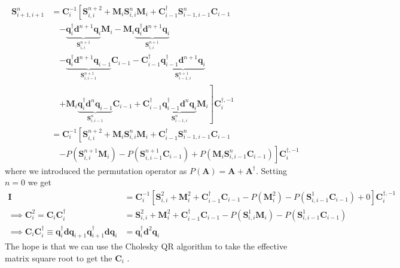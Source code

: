 \begin{align}
    \bm{S}_{i+1,i+1}^{n} &= \bm{C}_i^{-1}\left[\bm{S}_{i,i}^{n+2} + \bm{M}_i\bm{S}_{i,i}^{n}\bm{M}_i + \bm{C}_{i-1}^{\dag}\bm{S}_{i-1,i-1}^{n}\bm{C}_{i-1} \right. \nonumber \\
    &\quad \left. - \underbrace{\bm{q}_i^{\dag}\bm{d}^{n+1}\bm{q}_i}_{\bm{S}_{i,i}^{n+1}}\bm{M}_i - \bm{M}_i\underbrace{\bm{q}_i^{\dag}\bm{d}^{n+1}\bm{q}_i}_{\bm{S}_{i,i}^{n+1}} \right. \nonumber \\
    &\quad \left. - \underbrace{\bm{q}_{i}^{\dag}\bm{d}^{n+1}\bm{q}_{i-1}}_{\bm{S}_{i,i-1}^{n+1}}\bm{C}_{i-1} - \bm{C}_{i-1}^{\dag}\underbrace{\bm{q}_{i-1}^{\dag}\bm{d}^{n+1}\bm{q}_i}_{\bm{S}_{i-1,i}^{n+1}} \right. \nonumber \\
    &\quad \left. + \bm{M}_i\underbrace{\bm{q}_i^{\dag}\bm{d}^{n}\bm{q}_{i-1}}_{\bm{S}_{i,i-1}^n}\bm{C}_{i-1} + \bm{C}_{i-1}^{\dag}\underbrace{\bm{q}_{i-1}^{\dag}\bm{d}^{n}\bm{q}_i}_{\bm{S}_{i-1,i}^n}\bm{M}_i \right] \bm{C}_i^{\dag, -1} \\
    &= \bm{C}_i^{-1}\left[\bm{S}_{i,i}^{n+2} + \bm{M}_i\bm{S}_{i,i}^{n}\bm{M}_i + \bm{C}_{i-1}^{\dag}\bm{S}_{i-1,i-1}^{n}\bm{C}_{i-1} \right. \nonumber \\
    &\quad \left. - P(\bm{S}_{i,i}^{n+1}\bm{M}_i) - P(\bm{S}_{i,i-1}^{n+1}\bm{C}_{i-1}) + P(\bm{M}_i\bm{S}_{i,i-1}^{n}\bm{C}_{i-1}) \right] \bm{C}_i^{\dag, -1}
\end{align}
where we introduced the permutation operator as $P(\bm{A}) = \bm{A}+\bm{A}^{\dag}$. Setting $n=0$ we get
\begin{align}
    \bm{I} &= \bm{C}_i^{-1}\left[\bm{S}_{i,i}^2+\bm{M}_i^2+\bm{C}_{i-1}^{\dag}\bm{C}_{i-1}-P\left(\bm{M}_i^2\right) - P\left(\bm{S}_{i,i-1}^1\bm{C}_{i-1}\right) + 0\right] \bm{C}_i^{\dag, -1} \\
    \implies \bm{C}_i^2=\bm{C}_i\bm{C}_i^{\dag} &= \boxed{\bm{S}_{i,i}^2+\bm{M}_i^2+\bm{C}_{i-1}^{\dag}\bm{C}_{i-1}-P\left(\bm{S}_{i,i}^{1}\bm{M}_i\right) - P\left(\bm{S}_{i,i-1}^{1}\bm{C}_{i-1}\right)}\\
\implies \bm{C}_i \bm{C}_i^{\dag} \equiv \bm{q}_i^{\dag}\bm{d}\bm{q}_{i+1} \bm{q}_{i+1}^{\dag}\bm{d}\bm{q}_i &= \bm{q}_i^{\dag}\bm{d}^2\bm{q}_{i}
    \label{eqn:cholesky_recurrence}
\end{align}
The hope is that we can use the Cholesky QR algorithm to take the effective matrix square root to get the $\bm{C}_i$ . 
